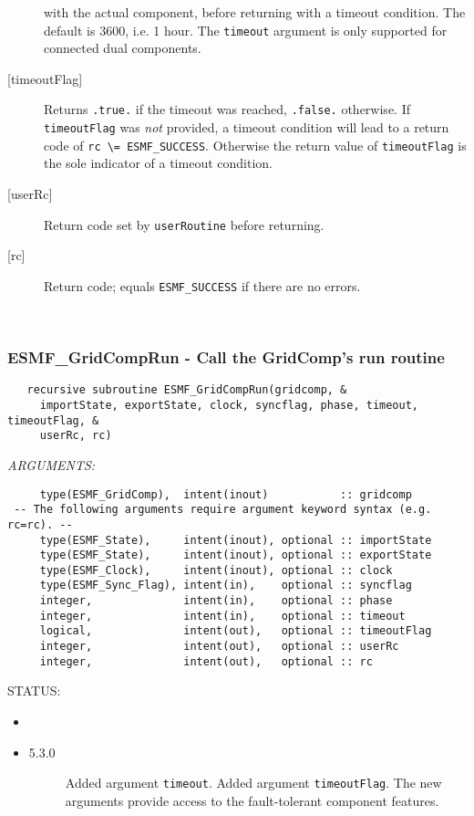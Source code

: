 \begin{description}
     with the actual component, before returning with a timeout condition.
     The default is 3600, i.e. 1 hour. The {\tt timeout} argument is only
     supported for connected dual components.
   \item[{[timeoutFlag]}]
     Returns {\tt .true.} if the timeout was reached, {\tt .false.} otherwise.
     If {\tt timeoutFlag} was {\em not} provided, a timeout condition will lead
     to a return code of {\tt rc \textbackslash = ESMF\_SUCCESS}. Otherwise the
     return value of {\tt timeoutFlag} is the sole indicator of a timeout
     condition.
   \item[{[userRc]}]
     Return code set by {\tt userRoutine} before returning.
   \item[{[rc]}]
     Return code; equals {\tt ESMF\_SUCCESS} if there are no errors.
   \end{description}
   
 
\mbox{}\hrulefill\ 
 
\subsubsection [ESMF\_GridCompRun] {ESMF\_GridCompRun - Call the GridComp's run routine}


  
\begin{verbatim}   recursive subroutine ESMF_GridCompRun(gridcomp, &
     importState, exportState, clock, syncflag, phase, timeout, timeoutFlag, &
     userRc, rc)\end{verbatim}{\em ARGUMENTS:}
\begin{verbatim}     type(ESMF_GridComp),  intent(inout)           :: gridcomp
 -- The following arguments require argument keyword syntax (e.g. rc=rc). --
     type(ESMF_State),     intent(inout), optional :: importState
     type(ESMF_State),     intent(inout), optional :: exportState
     type(ESMF_Clock),     intent(inout), optional :: clock
     type(ESMF_Sync_Flag), intent(in),    optional :: syncflag
     integer,              intent(in),    optional :: phase
     integer,              intent(in),    optional :: timeout
     logical,              intent(out),   optional :: timeoutFlag
     integer,              intent(out),   optional :: userRc
     integer,              intent(out),   optional :: rc\end{verbatim}
{\sf STATUS:}
   \begin{itemize}
   \item{}
   \item{}
   \begin{description}
   \item[5.3.0] Added argument {\tt timeout}.
                Added argument {\tt timeoutFlag}.
                The new arguments provide access to the fault-tolerant component
                features.
   \end{description}
   \end{itemize}
  
